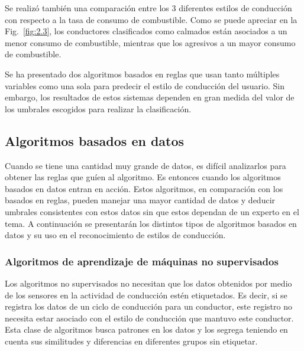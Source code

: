Se realizó también una comparación entre los 3 diferentes estilos de conducción con respecto a la tasa de consumo de combustible. Como se puede apreciar en la Fig.~\ref{fig:2.3}, los conductores clasificados como calmados están asociados a un menor consumo de combustible, mientras que los agresivos a un mayor consumo de combustible.


Se ha presentado dos algoritmos basados en reglas que usan tanto múltiples variables \cite{6957822} como una sola \cite{4938719} para predecir el estilo de conducción del usuario. Sin embargo, los resultados de estos sistemas dependen en gran medida del valor de los umbrales escogidos para realizar la clasificación.

\subsection{Algoritmos basados en datos}
Cuando se tiene una cantidad muy grande de datos, es difícil analizarlos para obtener las reglas que guíen al algoritmo. Es entonces cuando los algoritmos basados en datos entran en acción. Estos algoritmos, en comparación con los basados en reglas, pueden manejar una mayor cantidad de datos y deducir umbrales consistentes con estos datos sin que estos dependan de un experto en el tema. A continuación se presentarán los distintos tipos de algoritmos basados en datos y su uso en el reconocimiento de estilos de conducción.

\renewcommand{\thesubsubsection}{\Alph{subsubsection}}
\preto{\subsection}{\setcounter{subsubsection}{0}}

\subsubsection{Algoritmos de aprendizaje de máquinas no supervisados}
Los algoritmos no supervisados no necesitan que los datos obtenidos por medio de los sensores en la actividad de conducción estén etiquetados. Es decir, si se registra los datos de un ciclo de conducción para un conductor, este registro no necesita estar asociado con el estilo de conducción que mantuvo este conductor. Esta clase de algoritmos busca patrones en los datos y los segrega teniendo en cuenta sus similitudes y diferencias en diferentes grupos sin etiquetar.

